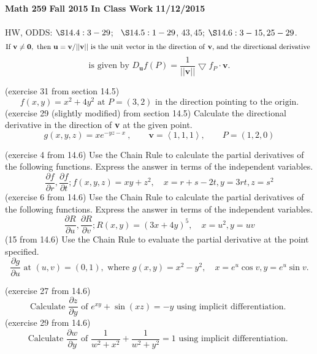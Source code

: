 \documentclass[12pt]{exam}
\newcommand{\class}{Math 259}
\newcommand{\term}{Fall 2015}
\newcommand{\examnum}{In Class Work}
\newcommand{\examdate}{11/12/2015}
\begin{document}
\noindent
\textbf{\class} \qquad \qquad \textbf{\term} \qquad\qquad 
\textbf{\examnum} \qquad\qquad \textbf{\examdate}  \\
\\
HW, ODDS: $\S 14.4:3-29$; \ $\S 14.5: 1-29 $, $ 43, 45$; $\S 14.6: 3-15, 25-29$. 
\[
\text{If }\textbf{v}\neq \textbf{0}, \text{ then } \textbf{u}= \textbf{v} \slash ||\textbf{v}|| \text{ is the unit vector in the direction of \textbf{v}, and the directional derivative }
\]
\[
\text{is given by } D_\textbf{u}f(P)=\frac{1}{||\textbf{v}||} \bigtriangledown f_P \cdot \textbf{v}. 
\]

\begin{questions}

\question [2] (exercise 31 from section 14.5)  
\[
f(x,y)=x^2+4y^2 \text{ at } P=(3,2) \text{ in the direction pointing to the origin}.
\]
\question [2] (exercise 29 (slightly modified) from section 14.5) Calculate the directional derivative in the direction of \textbf{v} at the given point.
\[
g(x,y,z)=xe^{-yz-x}\ , \qquad \textbf{v}=\left< 1,1,1 \right>, \qquad P=(1,2,0)
\]


\question  (exercise 4 from  14.6) Use the Chain Rule to calculate the partial derivatives of the following functions. Express the answer in terms of the independent variables. 
\[
\frac{\partial f}{\partial r}, \frac{\partial f}{\partial t}; f(x,y,z)=xy+z^2, \quad x= r+s-2t, y = 3rt, z=s^2
\]
\question  (exercise 6 from  14.6) Use the Chain Rule to calculate the partial derivatives of the following functions. Express the answer in terms of the independent variables. 
\[
\frac{\partial R}{\partial u}, \frac{\partial R}{\partial v}; R(x,y)=(3x+4y)^5, \quad x=u^2, y = uv
\]
\question (15 from 14.6) Use the Chain Rule to evaluate the partial derivative at the point specified.
\[
\frac{\partial g}{\partial u} \text{ at } (u,v)=(0,1), \text{ where } g(x,y)=x^2 - y^2, \quad x=e^u \cos v, y=e^u\sin v. 
\]

\question(exercise 27 from 14.6) 
\[
\text{Calculate } \frac{\partial z}{\partial y} \text{ of } e^{xy}+\sin(xz)=-y \text{ using implicit differentiation. }
\]
\question(exercise 29 from 14.6) 
\[
\text{Calculate } \frac{\partial w}{\partial y} \text{ of } \frac{1}{w^2+x^2}+\frac{1}{w^2+y^2}=1 \text{ using implicit differentiation. }
\]

\end{questions}
\end{document}
